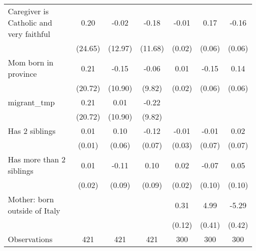 {\begin{tabular}{l*{6}{c}}
\addlinespace
Caregiver is Catholic and very faithful&        0.20         &       -0.02         &       -0.18         &       -0.01         &        0.17\sym{**} &       -0.16\sym{*}  \\
                    &     (24.65)         &     (12.97)         &     (11.68)         &      (0.02)         &      (0.06)         &      (0.06)         \\
\addlinespace
Mom born in province&        0.21         &       -0.15         &       -0.06         &        0.01         &       -0.15\sym{*}  &        0.14\sym{*}  \\
                    &     (20.72)         &     (10.90)         &      (9.82)         &      (0.02)         &      (0.06)         &      (0.06)         \\
\addlinespace
migrant\_tmp         &        0.21         &        0.01         &       -0.22         &                     &                     &                     \\
                    &     (20.72)         &     (10.90)         &      (9.82)         &                     &                     &                     \\
\addlinespace
Has 2 siblings      &        0.01         &        0.10         &       -0.12         &       -0.01         &       -0.01         &        0.02         \\
                    &      (0.01)         &      (0.06)         &      (0.07)         &      (0.03)         &      (0.07)         &      (0.07)         \\
\addlinespace
Has more than 2 siblings&        0.01         &       -0.11         &        0.10         &        0.02         &       -0.07         &        0.05         \\
                    &      (0.02)         &      (0.09)         &      (0.09)         &      (0.02)         &      (0.10)         &      (0.10)         \\
\addlinespace
Mother: born outside of Italy&                     &                     &                     &        0.31\sym{*}  &        4.99\sym{***}&       -5.29\sym{***}\\
                    &                     &                     &                     &      (0.12)         &      (0.41)         &      (0.42)         \\
\midrule
Observations        &         421         &         421         &         421         &         300         &         300         &         300         \\
\bottomrule
\end{tabular}
}
